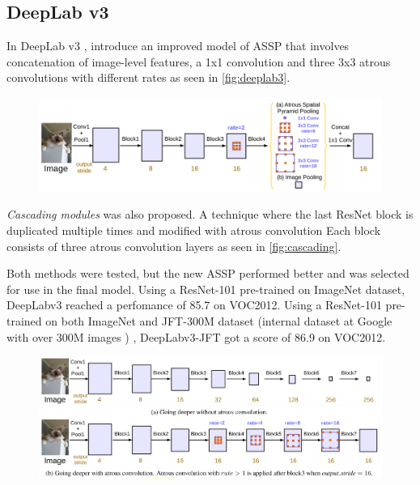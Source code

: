 \subsection{DeepLab v3}
In DeepLab v3 \cite{Chen2017a}, \citeauthor{Chen2017a} introduce an improved model of ASSP that involves concatenation of image-level features, a 1x1 convolution and three 3x3 atrous convolutions with different rates as seen in \autoref{fig:deeplab3}.

\begin{figure}[H]
	\centering
	\includegraphics[width=0.8\linewidth]{fig/deeplab3.png}
	\label{fig:deeplab3}
\end{figure}

\emph{Cascading modules} was also proposed. A technique where the last ResNet block is duplicated multiple times and modified with atrous convolution Each block consists of three atrous convolution layers as seen in \autoref{fig:cascading}.

Both methods were tested, but the new ASSP performed better and was selected for use in the final model. Using a ResNet-101 pre-trained on ImageNet dataset, DeepLabv3 reached a perfomance of 85.7 on VOC2012. Using a ResNet-101 pre-trained on both ImageNet and JFT-300M dataset (internal dataset at Google with over 300M images \cite{Hinton2015}\cite{Sun2017}) , DeepLabv3-JFT got a score of 86.9 on VOC2012.

\begin{figure}[H]
	\centering
	\includegraphics[width=0.8\linewidth]{fig/cascading.png}
	\label{fig:cascading}
\end{figure}




